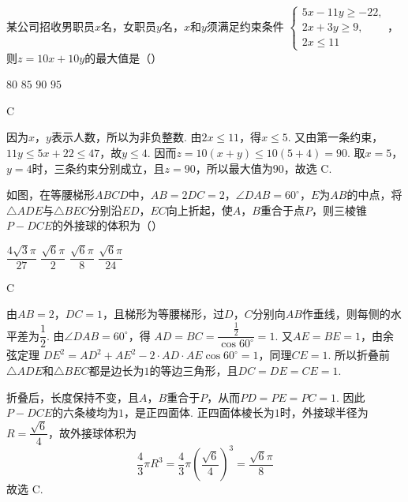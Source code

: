\begin{problem}
某公司招收男职员\(x\)名，女职员\(y\)名，\(x\)和\(y\)须满足约束条件
\(\begin{cases}
5x-11y\geqslant-22,\\
2x+3y\geqslant9,\\
2x\leqslant11
\end{cases}\)，则\(z=10x+10y\)的最大值是（\quad）

\choices
    {\(80\)}
    {\(85\)}
    {\(90\)}
    {\(95\)}
\end{problem}

\begin{answer}
C
\end{answer}

\begin{solution}
因为\(x\)，\(y\)表示人数，所以为非负整数. 由\(2x\leqslant11\)，得\(x\leqslant5\). 又由第一条约束，
\(11y\leqslant5x+22\leqslant47\)，故\(y\leqslant4\). 因而\(z=10(x+y)\leqslant10(5+4)=90\).
取\(x=5\)，\(y=4\)时，三条约束分别成立，且\(z=90\)，所以最大值为\(90\)，故选 C.
\end{solution}

\begin{problem}
如图，在等腰梯形\(ABCD\)中，\(AB=2DC=2\)，\(\angle DAB=60^\circ\)，\(E\)为\(AB\)的中点，将\(\triangle ADE\)与\(\triangle BEC\)分别沿\(ED\)，\(EC\)向上折起，使\(A\)，\(B\)重合于点\(P\)，则三棱锥\(P-DCE\)的外接球的体积为（\quad）


\choices
    {\(\dfrac{4\sqrt{3}\pi}{27}\)}
    {\(\dfrac{\sqrt{6}\pi}{2}\)}
    {\(\dfrac{\sqrt{6}\pi}{8}\)}
    {\(\dfrac{\sqrt{6}\pi}{24}\)}
\end{problem}

\begin{answer}
C
\end{answer}

\begin{solution}
由\(AB=2\)，\(DC=1\)，且梯形为等腰梯形，过\(D\)，\(C\)分别向\(AB\)作垂线，则每侧的水平差为\(\dfrac12\). 由\(\angle DAB=60^\circ\)，得
\(AD=BC=\dfrac{\frac12}{\cos60^\circ}=1\).
又\(AE=BE=1\)，由余弦定理
\(DE^2=AD^2+AE^2-2\cdot AD\cdot AE\cos60^\circ=1\)，同理\(CE=1\). 所以折叠前\(\triangle ADE\)和\(\triangle BEC\)都是边长为\(1\)的等边三角形，且\(DC=DE=CE=1\).

折叠后，长度保持不变，且\(A\)，\(B\)重合于\(P\)，从而\(PD=PE=PC=1\). 因此\(P-DCE\)的六条棱均为\(1\)，是正四面体. 正四面体棱长为\(1\)时，外接球半径为\(R=\dfrac{\sqrt{6}}{4}\)，故外接球体积为
\[
\frac43\pi R^3
=\frac43\pi\left(\frac{\sqrt6}{4}\right)^3
=\frac{\sqrt6\pi}{8}
\]
故选 C.
\end{solution}

